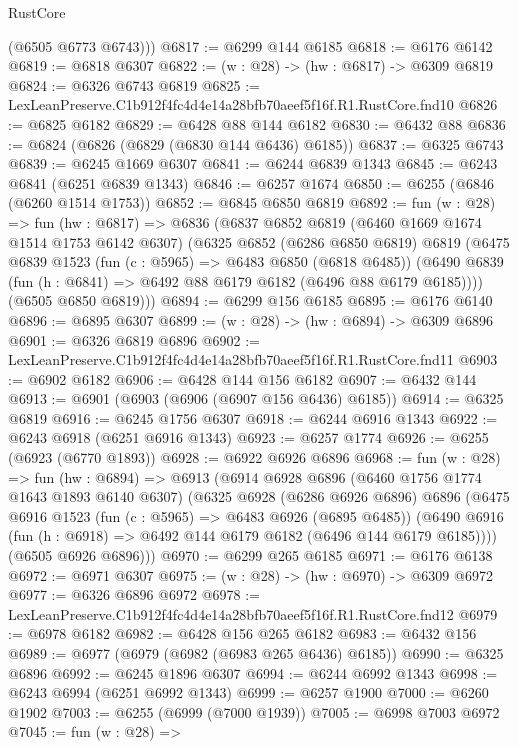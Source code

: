 \begin{lexlean}{RustCore}
\begin{coremodule}
        (@6505 @6773 @6743)))
@6817 := @6299 @144 @6185
@6818 := @6176 @6142
@6819 := @6818 @6307
@6822 := (w : @28) -> (hw : @6817) -> @6309 @6819
@6824 := @6326 @6743 @6819
@6825 := LexLeanPreserve.C1b912f4fc4d4e14a28bfb70aeef5f16f.R1.RustCore.fnd10
@6826 := @6825 @6182
@6829 := @6428 @88 @144 @6182
@6830 := @6432 @88
@6836 := @6824 (@6826 (@6829 (@6830 @144 @6436) @6185))
@6837 := @6325 @6743
@6839 := @6245 @1669 @6307
@6841 := @6244 @6839 @1343
@6845 := @6243 @6841 (@6251 @6839 @1343)
@6846 := @6257 @1674
@6850 := @6255 (@6846 (@6260 @1514 @1753))
@6852 := @6845 @6850 @6819
@6892 := fun (w : @28) =>
  fun (hw : @6817) =>
  @6836
    (@6837
      @6852
      @6819
      (@6460 @1669 @1674 @1514 @1753 @6142 @6307)
      (@6325
        @6852
        (@6286 @6850 @6819)
        @6819
        (@6475
          @6839
          @1523
          (fun (c : @5965) => @6483 @6850 (@6818 @6485))
          (@6490 @6839 (fun (h : @6841) => @6492 @88 @6179 @6182 (@6496 @88 @6179 @6185))))
        (@6505 @6850 @6819)))
@6894 := @6299 @156 @6185
@6895 := @6176 @6140
@6896 := @6895 @6307
@6899 := (w : @28) -> (hw : @6894) -> @6309 @6896
@6901 := @6326 @6819 @6896
@6902 := LexLeanPreserve.C1b912f4fc4d4e14a28bfb70aeef5f16f.R1.RustCore.fnd11
@6903 := @6902 @6182
@6906 := @6428 @144 @156 @6182
@6907 := @6432 @144
@6913 := @6901 (@6903 (@6906 (@6907 @156 @6436) @6185))
@6914 := @6325 @6819
@6916 := @6245 @1756 @6307
@6918 := @6244 @6916 @1343
@6922 := @6243 @6918 (@6251 @6916 @1343)
@6923 := @6257 @1774
@6926 := @6255 (@6923 (@6770 @1893))
@6928 := @6922 @6926 @6896
@6968 := fun (w : @28) =>
  fun (hw : @6894) =>
  @6913
    (@6914
      @6928
      @6896
      (@6460 @1756 @1774 @1643 @1893 @6140 @6307)
      (@6325
        @6928
        (@6286 @6926 @6896)
        @6896
        (@6475
          @6916
          @1523
          (fun (c : @5965) => @6483 @6926 (@6895 @6485))
          (@6490 @6916 (fun (h : @6918) => @6492 @144 @6179 @6182 (@6496 @144 @6179 @6185))))
        (@6505 @6926 @6896)))
@6970 := @6299 @265 @6185
@6971 := @6176 @6138
@6972 := @6971 @6307
@6975 := (w : @28) -> (hw : @6970) -> @6309 @6972
@6977 := @6326 @6896 @6972
@6978 := LexLeanPreserve.C1b912f4fc4d4e14a28bfb70aeef5f16f.R1.RustCore.fnd12
@6979 := @6978 @6182
@6982 := @6428 @156 @265 @6182
@6983 := @6432 @156
@6989 := @6977 (@6979 (@6982 (@6983 @265 @6436) @6185))
@6990 := @6325 @6896
@6992 := @6245 @1896 @6307
@6994 := @6244 @6992 @1343
@6998 := @6243 @6994 (@6251 @6992 @1343)
@6999 := @6257 @1900
@7000 := @6260 @1902
@7003 := @6255 (@6999 (@7000 @1939))
@7005 := @6998 @7003 @6972
@7045 := fun (w : @28) =>

\end{coremodule}
\end{lexlean}
